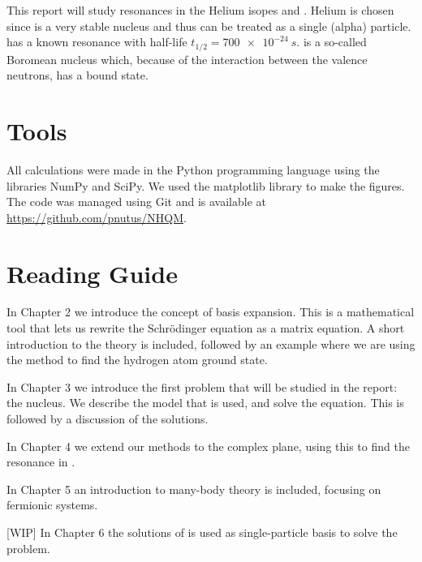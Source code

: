 This report will study resonances in the Helium isopes  and .
Helium is chosen since  is a very stable nucleus and thus can be treated as a single (alpha) particle.
 has a known resonance with half-life $t_{1/2} = \SI{700e-24}{s}$.
 is a so-called Boromean nucleus which, because of the interaction between the valence neutrons, has a bound state.



\section{Tools}

All calculations were made in the Python programming language using the libraries NumPy and SciPy. We used the matplotlib library to make the figures. The code was managed using Git and is available at \url{https://github.com/pnutus/NHQM}.


\section{Reading Guide}
In Chapter 2 we introduce the concept of basis expansion. This is a mathematical tool that lets us rewrite the Schrödinger equation as a matrix equation. A short introduction to the theory is included, followed by an example where we are using the method to find the hydrogen atom ground state.

In Chapter 3 we introduce the first problem that will be studied in the report: the  nucleus. We describe the model that is used, and solve the equation. This is followed by a discussion of the solutions.

In Chapter 4 we extend our methods to the complex plane, using this to find the resonance in .

In Chapter 5 an introduction to many-body theory is included, focusing on fermionic systems.  

[WIP] In Chapter 6 the solutions of  is used as single-particle basis to solve the  problem. 

